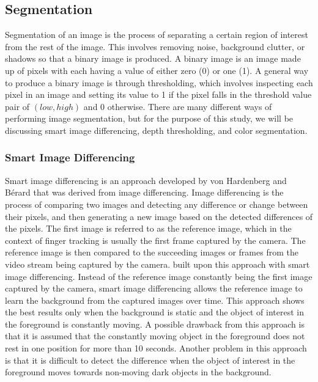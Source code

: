 \documentclass{acm_proc_article-sp}
\begin{document}
\subsection{Segmentation}

Segmentation of an image is the process of separating a certain region of interest from the rest of the image. This involves removing noise, background clutter, or shadows so that a binary image is produced. A binary image is an image made up of pixels with each having a value of either zero (0) or one (1). A general way to produce a binary image is through thresholding, which involves inspecting each pixel in an image and setting its value to 1 if the pixel falls in the threshold value pair of \( (low, high) \) and 0 otherwise. There are many different ways of performing image segmentation, but for the purpose of this study, we will be discussing smart image differencing, depth thresholding, and color segmentation.

\subsubsection{Smart Image Differencing}
Smart image differencing is an approach developed by von Hardenberg and B\'erard \cite{Hardenberg:2001} that was derived from image differencing. Image differencing is the process of comparing two images and detecting any difference or change between their pixels, and then generating a new image based on the detected differences of the pixels. The first image is referred to as the reference image, which in the context of finger tracking is usually the first frame captured by the camera. The reference image is then compared to the succeeding images or frames from the video stream being captured by the camera.
\cite{Hardenberg:2001} built upon this approach with smart image differencing. Instead of the reference image constantly being the first image captured by the camera, smart image differencing allows the reference
image to learn the background from the captured images over time. This approach shows the best results only when the background is static and the object of interest in the foreground is constantly moving. A possible drawback from this approach is that it is assumed that the constantly moving object in the foreground does not rest in one position for more than 10 seconds. Another problem in this approach is that it is difficult to detect the difference when the object of interest in the foreground moves towards non-moving dark objects in the background.
\end{document}
